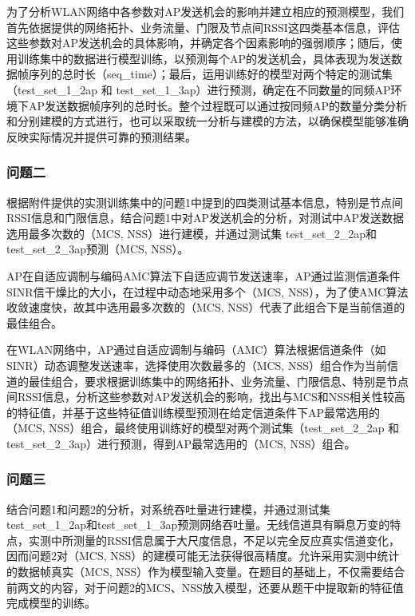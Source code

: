 为了分析WLAN网络中各参数对AP发送机会的影响并建立相应的预测模型，我们首先依据提供的网络拓扑、业务流量、门限及节点间RSSI这四类基本信息，评估这些参数对AP发送机会的具体影响，并确定各个因素影响的强弱顺序；随后，使用训练集中的数据进行模型训练，以预测每个AP的发送机会，具体表现为发送数据帧序列的总时长（seq\_time）；最后，运用训练好的模型对两个特定的测试集（test\_set\_1\_2ap 和 test\_set\_1\_3ap）进行预测，确定在不同数量的同频AP环境下AP发送数据帧序列的总时长。整个过程既可以通过按同频AP的数量分类分析和分别建模的方式进行，也可以采取统一分析与建模的方法，以确保模型能够准确反映实际情况并提供可靠的预测结果。

\subsubsection{问题二}
根据附件提供的实测训练集中的问题1中提到的四类测试基本信息，特别是节点间RSSI信息和门限信息，结合问题1中对AP发送机会的分析，对测试中AP发送数据选用最多次数的（MCS, NSS）进行建模，并通过测试集 test\_set\_2\_2ap和test\_set\_2\_3ap预测（MCS, NSS）。

AP在自适应调制与编码AMC算法下自适应调节发送速率，AP通过监测信道条件SINR信干燥比的大小，在过程中动态地采用多个（MCS, NSS），为了使AMC算法收敛速度快，故其中选用最多次数的（MCS, NSS）代表了此组合下是当前信道的最佳组合。

在WLAN网络中，AP通过自适应调制与编码（AMC）算法根据信道条件（如SINR）动态调整发送速率，选择使用次数最多的（MCS, NSS）组合作为当前信道的最佳组合，要求根据训练集中的网络拓扑、业务流量、门限信息、特别是节点间RSSI信息，分析这些参数对AP发送机会的影响，找出与MCS和NSS相关性较高的特征值，并基于这些特征值训练模型预测在给定信道条件下AP最常选用的（MCS, NSS）组合，最终使用训练好的模型对两个测试集（test\_set\_2\_2ap 和 test\_set\_2\_3ap）进行预测，得到AP最常选用的（MCS, NSS）组合。

\subsubsection{问题三}
结合问题1和问题2的分析，对系统吞吐量进行建模，并通过测试集test\_set\_1\_2ap和test\_set\_1\_3ap预测网络吞吐量。无线信道具有瞬息万变的特点，实测中所测量的RSSI信息属于大尺度信息，不足以完全反应真实信道变化，因而问题2对（MCS, NSS）的建模可能无法获得很高精度。允许采用实测中统计的数据帧真实（MCS, NSS）作为模型输入变量。在题目的基础上，不仅需要结合前两文的内容，对于问题2的MCS、NSS放入模型，还要从题干中提取新的特征值完成模型的训练。
